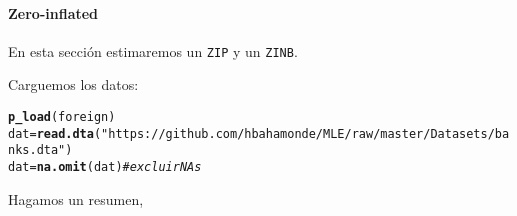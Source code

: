 \documentclass[onesided]{article}\usepackage[]{graphicx}\usepackage[]{color}
\makeatletter
\newcommand{\hlstr}[1]{\textcolor[rgb]{0.192,0.494,0.8}{#1}}%
\newcommand{\hlcom}[1]{\textcolor[rgb]{0.678,0.584,0.686}{\textit{#1}}}%
\newcommand{\hlstd}[1]{\textcolor[rgb]{0.345,0.345,0.345}{#1}}%
\newcommand{\hlkwb}[1]{\textcolor[rgb]{0.69,0.353,0.396}{#1}}%
\newcommand{\hlkwd}[1]{\textcolor[rgb]{0.737,0.353,0.396}{\textbf{#1}}}%
\newenvironment{kframe}{%
 \def\at@end@of@kframe{}%
 \ifinner\ifhmode%
  \def\at@end@of@kframe{\end{minipage}}%
  \begin{minipage}{\columnwidth}%
 \fi\fi%
 \def\FrameCommand##1{\hskip\@totalleftmargin \hskip-\fboxsep
 \colorbox{shadecolor}{##1}\hskip-\fboxsep
     \hskip-\linewidth \hskip-\@totalleftmargin \hskip\columnwidth}%
 \MakeFramed {\advance\hsize-\width
   \@totalleftmargin\z@ \linewidth\hsize
   \@setminipage}}%
 {\par\unskip\endMakeFramed%
 \at@end@of@kframe}
\newenvironment{knitrout}{}{} %
\makeatother
\begin{document}
\paragraph{Zero-inflated} En esta secci\'on estimaremos un \texttt{ZIP} y un \texttt{ZINB}.

Carguemos los datos:

\begin{knitrout}
\color{fgcolor}\begin{kframe}
\begin{alltt}
\hlkwd{p_load}\hlstd{(foreign)}
\hlstd{dat} \hlkwb{=} \hlkwd{read.dta}\hlstd{(}\hlstr{"https://github.com/hbahamonde/MLE/raw/master/Datasets/banks.dta"}\hlstd{)}
\hlstd{dat} \hlkwb{=} \hlkwd{na.omit}\hlstd{(dat)} \hlcom{# excluir NAs}
\end{alltt}
\end{kframe}
\end{knitrout}

Hagamos un resumen,
\end{document}
